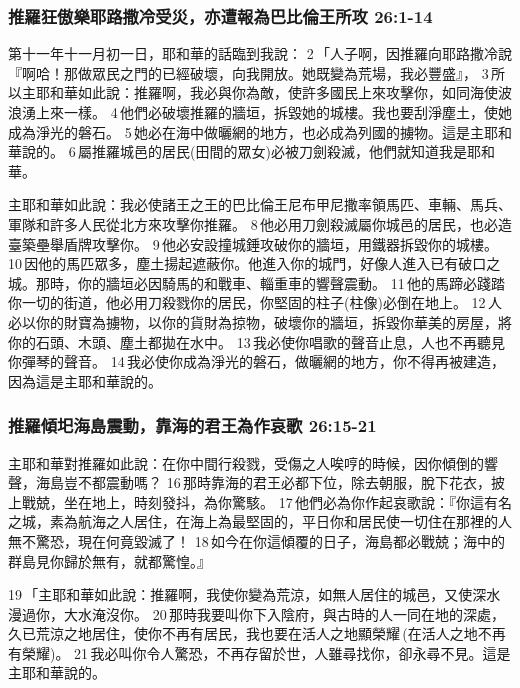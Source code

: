 \subsubsection{推羅狂傲樂耶路撒冷受災，亦遭報為巴比倫王所攻 26:1-14}
第十一年十一月初一日，耶和華的話臨到我說： 2 「人子啊，因推羅向耶路撒冷說『啊哈！那做眾民之門的已經破壞，向我開放。她既變為荒場，我必豐盛』， 3 所以主耶和華如此說：推羅啊，我必與你為敵，使許多國民上來攻擊你，如同海使波浪湧上來一樣。 4 他們必破壞推羅的牆垣，拆毀她的城樓。我也要刮淨塵土，使她成為淨光的磐石。 5 她必在海中做曬網的地方，也必成為列國的擄物。這是主耶和華說的。 6 屬推羅城邑的居民(田間的眾女)必被刀劍殺滅，他們就知道我是耶和華。

主耶和華如此說：我必使諸王之王的巴比倫王尼布甲尼撒率領馬匹、車輛、馬兵、軍隊和許多人民從北方來攻擊你推羅。 8 他必用刀劍殺滅屬你城邑的居民，也必造臺築壘舉盾牌攻擊你。 9 他必安設撞城錘攻破你的牆垣，用鐵器拆毀你的城樓。 10 因他的馬匹眾多，塵土揚起遮蔽你。他進入你的城門，好像人進入已有破口之城。那時，你的牆垣必因騎馬的和戰車、輜重車的響聲震動。 11 他的馬蹄必踐踏你一切的街道，他必用刀殺戮你的居民，你堅固的柱子(柱像)必倒在地上。 12 人必以你的財寶為擄物，以你的貨財為掠物，破壞你的牆垣，拆毀你華美的房屋，將你的石頭、木頭、塵土都拋在水中。 13 我必使你唱歌的聲音止息，人也不再聽見你彈琴的聲音。 14 我必使你成為淨光的磐石，做曬網的地方，你不得再被建造，因為這是主耶和華說的。


\subsubsection{推羅傾圯海島震動，靠海的君王為作哀歌 26:15-21}
主耶和華對推羅如此說：在你中間行殺戮，受傷之人唉哼的時候，因你傾倒的響聲，海島豈不都震動嗎？ 16 那時靠海的君王必都下位，除去朝服，脫下花衣，披上戰兢，坐在地上，時刻發抖，為你驚駭。 17 他們必為你作起哀歌說：『你這有名之城，素為航海之人居住，在海上為最堅固的，平日你和居民使一切住在那裡的人無不驚恐，現在何竟毀滅了！ 18 如今在你這傾覆的日子，海島都必戰兢；海中的群島見你歸於無有，就都驚惶。』

19 「主耶和華如此說：推羅啊，我使你變為荒涼，如無人居住的城邑，又使深水漫過你，大水淹沒你。 20 那時我要叫你下入陰府，與古時的人一同在地的深處，久已荒涼之地居住，使你不再有居民，我也要在活人之地顯榮耀 (在活人之地不再有榮耀)。 21 我必叫你令人驚恐，不再存留於世，人雖尋找你，卻永尋不見。這是主耶和華說的。



